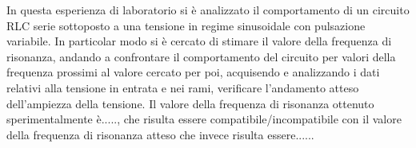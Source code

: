 In questa esperienza di laboratorio si è analizzato il comportamento di un circuito RLC serie sottoposto a una tensione in regime sinusoidale con pulsazione variabile.
In particolar modo si è cercato di stimare il valore della frequenza di risonanza, andando a confrontare il comportamento del circuito per valori della frequenza prossimi al valore cercato per poi, acquisendo e analizzando i dati relativi alla tensione in entrata e nei rami, verificare l’andamento atteso dell’ampiezza della tensione.
Il valore della frequenza di risonanza ottenuto sperimentalmente è....., che risulta essere compatibile/incompatibile con il valore della frequenza di risonanza atteso che invece risulta essere......
